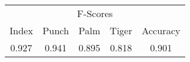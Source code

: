 \documentclass{standalone}
\begin{document}
 
 \begin{tabular}{|c|c|c|c ||c|}
\cline{1-5}\multicolumn{5}{|c|}{F-Scores} \\ 
\cline{1-5}Index & Punch & Palm & Tiger & Accuracy\\ 
\cline{1-5}0.927 & 0.941 & 0.895 & 0.818 & 0.901\\ 
 \cline{1-5}\hline \end{tabular}
 
\end{document}
